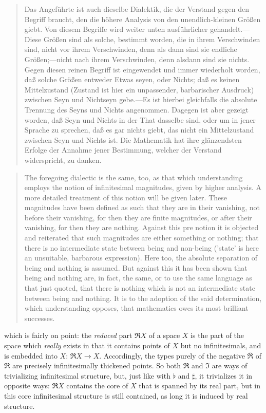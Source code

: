 \documentclass{article}
\begin{document}
\begin{quote}
    Das Angeführte ist auch dieselbe Dialektik, die der Verstand gegen den Begriff braucht, den die höhere Analysis von den unendlich-kleinen Größen giebt. Von diesem Begriffe wird weiter unten ausführlicher gehandelt.—Diese Größen sind als solche, bestimmt worden, die in ihrem Verschwinden sind, nicht vor ihrem Verschwinden, denn als dann sind sie endliche Größen;—nicht nach ihrem Verschwinden, denn alsdann sind sie nichts. Gegen diesen reinen Begriff ist eingewendet und immer wiederholt worden, daß solche Größen entweder Etwas seyen, oder Nichts; daß es keinen Mittelzustand (Zustand ist hier ein unpassender, barbarischer Ausdruck) zwischen Seyn und Nichtseyn gebe.—Es ist hierbei gleichfalls die absolute Trennung des Seyns und Nichts angenommen. Dagegen ist aber gezeigt worden, daß Seyn und Nichts in der That dasselbe sind, oder um in jener Sprache zu sprechen, daß es gar nichts giebt, das nicht ein Mittelzustand zwischen Seyn und Nichts ist. Die Mathematik hat ihre glänzendsten Erfolge der Annahme jener Bestimmung, welcher der Verstand widerspricht, zu danken.
\end{quote}

\begin{quote}
    The foregoing dialectic is the same, too, as that which understanding employs the notion of infinitesimal magnitudes, given by higher analysis. A more detailed treatment of this notion will be given later. These magnitudes have been defined as such that they are in their vanishing, not before their vanishing, for then they are finite magnitudes, or after their vanishing, for then they are nothing. Against this pre notion it is objected and reiterated that such magnitudes are either something or nothing; that there is no intermediate state between being and non-being ('state' is here an unsuitable, barbarous expression). Here too, the absolute separation of being and nothing is assumed. But against this it has been shown that being and nothing are, in fact, the same, or to use the same language as that just quoted, that there is nothing which is not an intermediate state between being and nothing. It is to the adoption of the said determination, which understanding opposes, that mathematics owes its most brilliant successes.
\end{quote}    

which is fairly on point: the \emph{reduced} part $\Re X$ of a space $X$ is the part of the space which \emph{really} exists in that it contains points of $X$ but no infinitesimals, and is embedded into $X$: $\Re X\rightarrow X$. Accordingly, the types purely of the negative $\overline{\Re}$ of $\Re$ are precisely infinitesimally thickened points. So both $\Re$ and $\Im$ are ways of trivializing infinitesimal structure, but, just like with $\flat$ and  $\sharp$, it trivializes it in opposite ways: $\Re X$ contains the core of $X$ that is spanned by its real part, but in this core infinitesimal structure is still contained, as long it is induced by real structure. 
\end{document}
